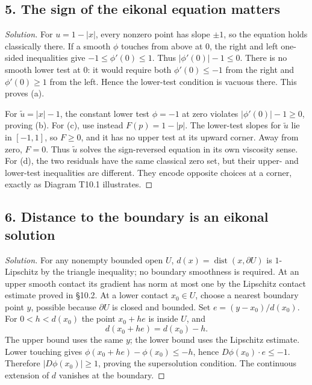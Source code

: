 \subsection*{5. The sign of the eikonal equation matters}
\begin{proof}[Solution]
For $u=1-|x|$, every nonzero point has slope $\pm1$, so the equation
holds classically there. If a smooth $\phi$ touches from above at $0$,
the right and left one-sided inequalities give
$-1\leq\phi'(0)\leq1$. Thus $|\phi'(0)|-1\leq0$.
There is no smooth lower test at $0$: it would require both
$\phi'(0)\leq-1$ from the right and $\phi'(0)\geq1$ from the left.
Hence the lower-test condition is vacuous there. This proves (a).

For $\tilde u=|x|-1$, the constant lower test $\phi=-1$ at zero
violates $|\phi'(0)|-1\geq0$, proving (b).
For (c), use instead $F(p)=1-|p|$. The lower-test slopes for $\tilde u$
lie in $[-1,1]$, so $F\geq0$, and it has no upper test at its upward
corner. Away from zero, $F=0$. Thus $\tilde u$ solves the sign-reversed
equation in its own viscosity sense. For (d), the two residuals have the
same classical zero set, but their upper- and lower-test inequalities
are different. They encode opposite choices at a corner, exactly as
Diagram T10.1 illustrates.
\end{proof}
\Needspace{42mm}

\subsection*{6. Distance to the boundary is an eikonal solution}
\begin{proof}[Solution]
For any nonempty bounded open $U$, $d(x)=\operatorname{dist}(x,\partial U)$
is $1$-Lipschitz by the triangle inequality; no boundary smoothness is
required. At an upper smooth contact its gradient has norm at most one
by the Lipschitz contact estimate proved in \S10.2.
At a lower contact $x_0\in U$, choose a nearest boundary point $y$,
possible because $\partial U$ is closed and bounded. Set
$e=(y-x_0)/d(x_0)$. For $0<h<d(x_0)$ the point $x_0+he$ is inside
$U$, and
\[
 d(x_0+he)=d(x_0)-h.
\]
The upper bound uses the same $y$; the lower bound uses the Lipschitz
estimate. Lower touching gives
$\phi(x_0+he)-\phi(x_0)\leq-h$, hence $D\phi(x_0)\cdot e\leq-1$.
Therefore $|D\phi(x_0)|\geq1$, proving the supersolution condition.
The continuous extension of $d$ vanishes at the boundary.
\end{proof}

